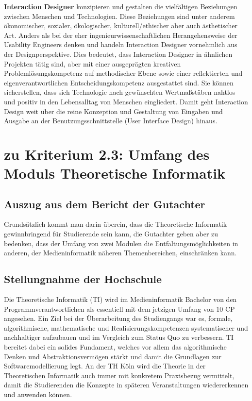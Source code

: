 \textbf{Interaction Designer} konzipieren und gestalten die vielfältigen
Beziehungen zwischen Menschen und Technologien. Diese Beziehungen sind
unter anderem ökonomischer, sozialer, ökologischer, kulturell/ethischer
aber auch ästhetischer Art. Anders als bei der eher
ingenieurwissenschaftlichen Herangehensweise der Usability Engineers
denken und handeln Interaction Designer vornehmlich aus der
Designperspektive. Dies bedeutet, dass Interaction Designer in ähnlichen
Projekten tätig sind, aber mit einer ausgeprägten kreativen
Problemlösungskompetenz auf methodischer Ebene sowie einer reflektierten
und eigenverantwortlichen Entscheidungskompetenz ausgestattet sind. Sie
können sicherstellen, dass sich Technologie nach gewünschten
Wertmaßstäben nahtlos und positiv in den Lebensalltag von Menschen
eingliedert. Damit geht Interaction Design weit über die reine
Konzeption und Gestaltung von Eingaben und Ausgabe an der
Benutzungsschnittstelle (User Interface Design) hinaus.

\section{zu Kriterium 2.3: Umfang des Moduls Theoretische
Informatik}\label{zu-kriterium-2.3-umfang-des-moduls-theoretische-informatik}

\subsection{Auszug aus dem Bericht der
Gutachter}\label{auszug-aus-dem-bericht-der-gutachter-1}

\begin{siderules}
Grundsätzlich kommt man darin überein, dass die Theoretische Informatik
gewinnbringend für Studierende sein kann, die Gutachter geben aber zu
bedenken, dass der Umfang von zwei Modulen die Entfaltungsmöglichkeiten
in anderen, der Medieninformatik näheren Themenbereichen, einschränken
kann.
\end{siderules}

\subsection{Stellungnahme der
Hochschule}\label{stellungnahme-der-hochschule}

Die Theoretische Informatik (TI) wird im Medieninformatik Bachelor von
den Programmverantwortlichen als essentiell mit dem jetzigen Umfang von
10 CP angesehen. Ein Ziel bei der Überarbeitung des Studiengangs war es,
formale, algorithmische, mathematische und Realisierungskompetenzen
systematischer und nachhaltiger aufzubauen und im Vergleich zum Status
Quo zu verbessern. TI bereitet dabei ein solides Fundament, welches vor
allem das algorithmische Denken und Abstraktionsvermögen stärkt und
damit die Grundlagen zur Softwaremodellierung legt. An der TH Köln wird
die Theorie in der Theoretischen Informatik auch immer mit konkretem
Praxisbezug vermittelt, damit die Studierenden die Konzepte in späteren
Veranstaltungen wiedererkennen und anwenden können.

